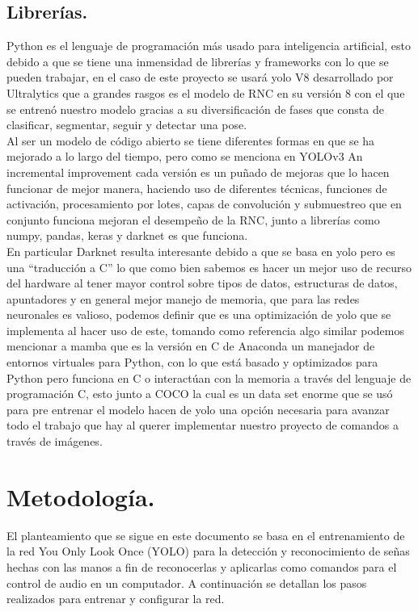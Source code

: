 \documentclass[a4paper, 12pt]{article}
\begin{document}
    \subsection{Librerías.} 
    Python es el lenguaje de programación más usado para inteligencia artificial, esto debido a que se tiene una inmensidad de librerías y frameworks con lo que se pueden trabajar, en el caso de este proyecto se usará yolo V8 desarrollado por Ultralytics que a grandes rasgos es el modelo de RNC en su versión 8 con el que se entrenó nuestro modelo gracias a su diversificación de fases que consta de clasificar, segmentar, seguir y detectar una pose.\\  
    Al ser un modelo de código abierto se tiene diferentes formas en que se ha mejorado a lo largo del tiempo, pero como se menciona en YOLOv3 An incremental improvement\cite{redmon2018yolov3} cada versión es un puñado de mejoras que lo hacen funcionar de mejor manera, haciendo uso de diferentes técnicas, funciones de activación, procesamiento por lotes, capas de convolución y submuestreo que en conjunto funciona mejoran el desempeño de la RNC, junto a librerías como numpy, pandas, keras y darknet es que funciona.\\  
    En particular Darknet resulta interesante debido a que se basa en yolo pero es una “traducción a C” lo que como bien sabemos es hacer un mejor uso de recurso del hardware al tener mayor control sobre tipos de datos, estructuras de datos, apuntadores y en general mejor manejo de memoria, que para las redes neuronales es valioso, podemos definir que es una optimización de yolo que se implementa al hacer uso de este, tomando como referencia algo similar podemos mencionar a mamba que es la versión en C de Anaconda un manejador de entornos virtuales para Python, con lo que está basado y optimizados para Python pero funciona en C o interactúan con la memoria a través del lenguaje de programación C, esto junto a COCO la cual es un data set enorme que se usó para pre entrenar el modelo hacen de yolo una opción necesaria para avanzar todo el trabajo que hay al querer implementar nuestro proyecto de comandos a través de imágenes.  


    \section{Metodología.} 
    El planteamiento que se sigue en este documento se basa en el entrenamiento de la red You Only Look Once (YOLO) para la detección y reconocimiento de señas hechas con las manos a fin de reconocerlas y aplicarlas como comandos para el control de audio en un computador. A continuación se detallan los pasos realizados para entrenar y configurar la red. 
\end{document}
